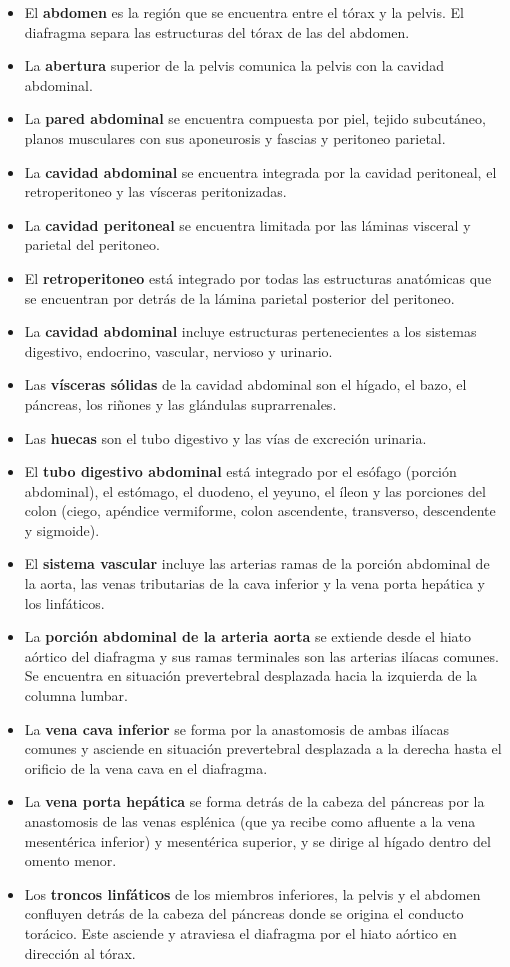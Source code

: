 \begin{itemize}
	\item El \textbf{abdomen} es la región que se encuentra entre el tórax y la pelvis. El diafragma separa las estructuras del tórax de las del abdomen. 
	\item La \textbf{abertura} superior de la pelvis comunica la pelvis con la cavidad abdominal.
	\item La \textbf{pared abdominal} se encuentra compuesta por piel, tejido subcutáneo, planos musculares con sus aponeurosis y fascias y peritoneo parietal.
	\item La \textbf{cavidad abdominal} se encuentra integrada por la cavidad peritoneal, el retroperitoneo y las vísceras peritonizadas.
	\item La \textbf{cavidad peritoneal} se encuentra limitada por las láminas visceral y parietal del peritoneo.
	\item El \textbf{retroperitoneo} está integrado por todas las estructuras anatómicas que se encuentran por detrás de la lámina parietal posterior del peritoneo.
	\item La \textbf{cavidad abdominal} incluye estructuras pertenecientes a los sistemas digestivo, endocrino, vascular, nervioso y urinario.
	\item Las \textbf{vísceras sólidas} de la cavidad abdominal son el hígado, el bazo, el páncreas, los riñones y las glándulas suprarrenales.
	\item Las \textbf{huecas} son el tubo digestivo y las vías de excreción urinaria. 
	\item El \textbf{tubo digestivo abdominal} está integrado por el esófago (porción abdominal), el estómago, el duodeno, el yeyuno, el íleon y las porciones del colon (ciego, apéndice vermiforme, colon ascendente, transverso, descendente y sigmoide).
	\item El \textbf{sistema vascular} incluye las arterias ramas de la porción abdominal de la aorta, las venas tributarias de la cava inferior y la vena porta hepática y los linfáticos.
	\item La \textbf{porción abdominal de la arteria aorta} se extiende desde el hiato aórtico del diafragma y sus ramas terminales son las arterias ilíacas comunes. Se encuentra en situación prevertebral desplazada hacia la izquierda de la columna lumbar. 
	\item La \textbf{vena cava inferior} se forma por la anastomosis de ambas ilíacas comunes y asciende en situación prevertebral desplazada a la derecha hasta el orificio de la vena cava en el diafragma.
	\item La \textbf{vena porta hepática} se forma detrás de la cabeza del páncreas por la anastomosis de las venas esplénica (que ya recibe como afluente a la vena mesentérica inferior) y mesentérica superior, y se dirige al hígado dentro del omento menor.
	\item Los \textbf{troncos linfáticos} de los miembros inferiores, la pelvis y el abdomen confluyen detrás de la cabeza del páncreas donde se origina el conducto torácico. Este asciende y atraviesa el diafragma por el hiato aórtico en dirección al tórax.
\end{itemize}

